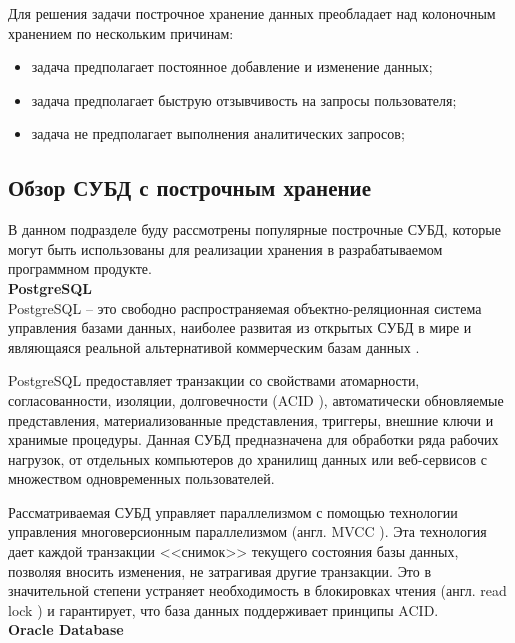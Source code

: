 Для решения задачи построчное хранение данных преобладает над колоночным хранением по нескольким причинам:

\begin{itemize}
	\item задача предполагает постоянное добавление и изменение данных;
	\item задача предполагает быструю отзывчивость на запросы пользователя;
	\item задача не предполагает выполнения аналитических запросов;
\end{itemize}

\subsection{Обзор СУБД с построчным хранение}

В данном подразделе буду рассмотрены популярные построчные СУБД, которые могут быть использованы для реализации хранения в разрабатываемом программном продукте.\\

\noindent\textbf{PostgreSQL}\\

PostgreSQL \cite{postgresql} -- это свободно распространяемая объектно-реляционная система управления базами данных, наиболее развитая из открытых СУБД в мире и являющаяся реальной альтернативой коммерческим базам данных \cite{postgresql-fact}.

PostgreSQL предоставляет транзакции со свойствами атомарности, согласованности, изоляции, долговечности (ACID \cite{acid}), автоматически обновляемые представления, материализованные представления, триггеры, внешние ключи и хранимые процедуры. Данная СУБД предназначена для обработки ряда рабочих нагрузок, от отдельных компьютеров до хранилищ данных или веб-сервисов с множеством одновременных пользователей. 

Рассматриваемая СУБД управляет параллелизмом с помощью технологии управления многоверсионным параллелизмом (англ. MVCC \cite{mvcc}). Эта технология дает каждой транзакции <<снимок>> текущего состояния базы данных, позволяя вносить изменения, не затрагивая другие транзакции. Это в значительной степени устраняет необходимость в блокировках чтения (англ. read lock \cite{r-lock}) и гарантирует, что база данных поддерживает принципы ACID. \\

\noindent\textbf{Oracle Database}\\

